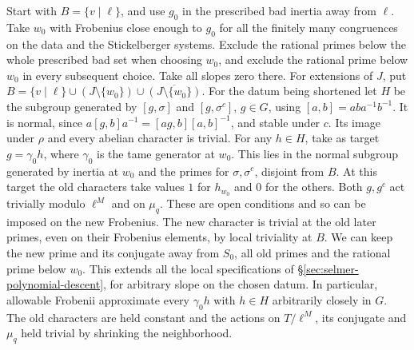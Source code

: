 Start with $B=\{v\mid\ell\}$, and use $g_0$ in the prescribed bad
inertia away from $\ell$. Take $w_0$ with Frobenius close enough to
$g_0$ for all the finitely many congruences on the data and the
Stickelberger systems. Exclude the rational primes below the whole prescribed bad set when choosing $w_0$, and exclude the rational prime below $w_0$ in every subsequent choice. Take all slopes zero there. For extensions of
$J$, put $B=\{v\mid\ell\}\cup(J\setminus\{w_0\})\cup
\overline{(J\setminus\{w_0\})}$. For the datum being shortened let
$H$ be the subgroup generated by $[g,\sigma]$ and $[g,\sigma^c]$,
$g\in G$, using $[a,b]=aba^{-1}b^{-1}$. It is normal, since
$a[g,b]a^{-1}=[ag,b][a,b]^{-1}$, and stable under $c$.
Its image under $\rho$ and every abelian character is trivial. For
any $h\in H$, take as target $g=\gamma_0 h$, where $\gamma_0$ is the
tame generator at $w_0$. This lies in the normal subgroup generated by
inertia at $w_0$ and the primes for $\sigma,\sigma^c$, disjoint from $B$.
At this target the old characters take values $1$ for $h_{w_0}$ and $0$
for the others. Both $g,g^c$ act trivially modulo $\ell^M$ and on
$\mu_q$. These are open conditions and so can be imposed on the new
Frobenius. The new character is trivial at the old later primes, even
on their Frobenius elements, by local triviality at $B$. We can keep
the new prime and its conjugate away from $S_0$, all old primes and
the rational prime below $w_0$. This extends all the local specifications
of \S\ref{sec:selmer-polynomial-descent}, for arbitrary slope on the
chosen datum. In particular, allowable Frobenii approximate every
$\gamma_0 h$ with $h\in H$ arbitrarily closely in $G$. The old characters are held constant and the actions on $T/\ell^M$, its conjugate and $\mu_q$ held trivial by shrinking the neighborhood.

